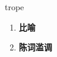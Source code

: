 
\begin{frame}
{\huge trope}
\begin{center}
\begin{enumerate}\Large
  \item \textbf{比喻}
  \item \textbf{陈词滥调}
\end{enumerate}
\end{center}
\end{frame}
